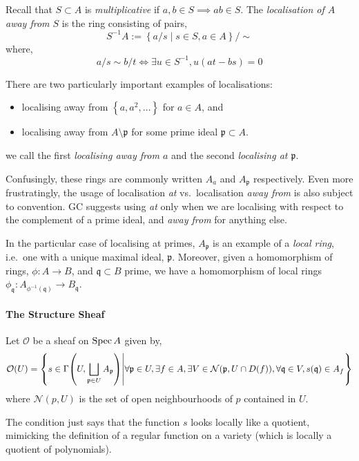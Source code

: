 \documentclass[000-main.tex]{subfiles}
\begin{document}
Recall that $S\subset A$ is \emph{multiplicative} if $a, b\in S \implies ab\in S$.
The \emph{localisation of $A$ away from $S$} is the ring consisting of pairs,
\begin{displaymath}
  S^{-1}A := \left\{ a/s \mid s\in S, a\in A \right\}/\sim
\end{displaymath}
where,
\begin{displaymath}
  a/s \sim b/t \iff
  \exists u\in S^{-1}, u(at - bs) = 0
\end{displaymath}

There are two particularly important examples of localisations:
\begin{itemize}
  \item localising away from $\left\{a, a^2, \ldots \right\}$ for $a\in A$, and
  \item localising away from $A\setminus\mathfrak{p}$ for some prime ideal $\mathfrak{p}\subset A$.
\end{itemize}
we call the first \emph{localising away from $a$} and the second \emph{localising at $\mathfrak{p}$}.

Confusingly, these rings are commonly written $A_a$ and $A_{\mathfrak{p}}$ respectively.
Even more frustratingly, the usage of localisation \emph{at} vs.\ localisation \emph{away from} is also subject to convention.
GC suggests using \emph{at} only when we are localising with respect to the complement of a prime ideal, and \emph{away from} for anything else.

In the particular case of localising at primes, $A_\mathfrak{p}$ is an example of a \emph{local ring}, i.e.\ one with a unique maximal ideal, $\mathfrak{p}$.
Moreover, given a homomorphism of rings, $\phi : A \to B$, and $\mathfrak{q}\subset B$ prime, we have a homomorphism of local rings $\phi_{\mathfrak{q}} : A_{\phi^{-1}(\mathfrak{q})} \to B_{\mathfrak{q}}$.

\paragraph{The Structure Sheaf}

\begin{definition}
  Let $\mathcal{O}$ be a sheaf on $\operatorname{Spec} A$ given by,
  \[
    \mathcal{O}(U) = \qty{
      s \in \Gamma\qty(U, \bigsqcup_{\mathfrak{p} \in U} A_{\mathfrak{p}})
      \middle\vert
      \forall \mathfrak{p}\in U,
      \exists f \in A,
      \exists V\in \mathcal{N}(\mathfrak{p}, U\cap D(f)),
      \forall \mathfrak{q} \in V, s(\mathfrak{q}) \in A_f
    }
  \]
  where $\mathcal{N}(p, U)$ is the set of open neighbourhoods of $p$ contained in $U$.
\end{definition}
The condition just says that the function $s$ looks locally like a quotient, mimicking the definition of a regular function on a variety (which is locally a quotient of polynomials).
\end{document}
